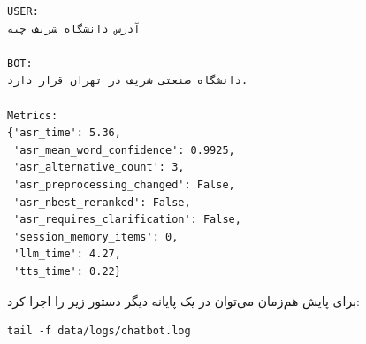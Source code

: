 \begin{latin}\begin{verbatim}
USER:
آدرس دانشگاه شریف چیه

BOT:
دانشگاه صنعتی شریف در تهران قرار دارد.

Metrics:
{'asr_time': 5.36,
 'asr_mean_word_confidence': 0.9925,
 'asr_alternative_count': 3,
 'asr_preprocessing_changed': False,
 'asr_nbest_reranked': False,
 'asr_requires_clarification': False,
 'session_memory_items': 0,
 'llm_time': 4.27,
 'tts_time': 0.22}
\end{verbatim}\end{latin}

برای پایش هم‌زمان می‌توان در یک پایانه دیگر دستور زیر را اجرا کرد:

\begin{latin}\begin{verbatim}
tail -f data/logs/chatbot.log
\end{verbatim}\end{latin}
